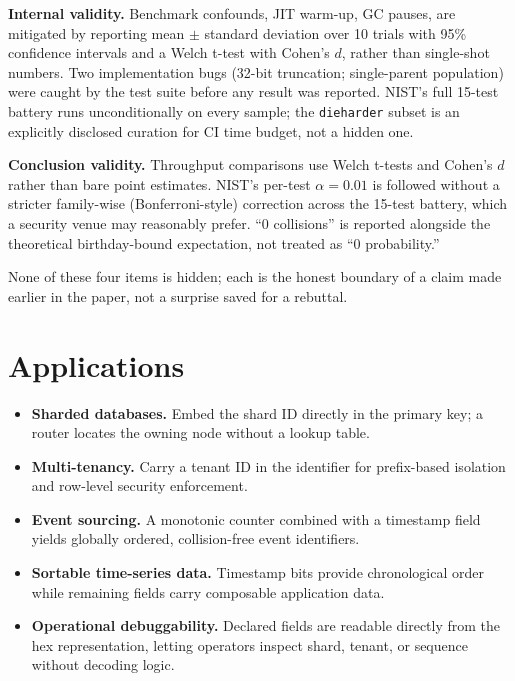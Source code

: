 \documentclass[conference]{IEEEtran}
\begin{document}
\textbf{Internal validity.} Benchmark confounds, JIT warm-up, GC pauses, are mitigated by reporting mean $\pm$ standard deviation over 10 trials with 95\% confidence intervals and a Welch t-test with Cohen's $d$, rather than single-shot numbers. Two implementation bugs (32-bit truncation; single-parent population) were caught by the test suite before any result was reported. NIST's full 15-test battery runs unconditionally on every sample; the \texttt{dieharder} subset is an explicitly disclosed curation for CI time budget, not a hidden one.

\textbf{Conclusion validity.} Throughput comparisons use Welch t-tests and Cohen's $d$ rather than bare point estimates. NIST's per-test $\alpha=0.01$ is followed without a stricter family-wise (Bonferroni-style) correction across the 15-test battery, which a security venue may reasonably prefer. ``0 collisions'' is reported alongside the theoretical birthday-bound expectation, not treated as ``0 probability.''

None of these four items is hidden; each is the honest boundary of a claim made earlier in the paper, not a surprise saved for a rebuttal.

\section{Applications}
\begin{itemize}
    \item \textbf{Sharded databases.} Embed the shard ID directly in the primary key; a router locates the owning node without a lookup table.

    \item \textbf{Multi-tenancy.} Carry a tenant ID in the identifier for prefix-based isolation and row-level security enforcement.

    \item \textbf{Event sourcing.} A monotonic counter combined with a timestamp field yields globally ordered, collision-free event identifiers.

    \item \textbf{Sortable time-series data.} Timestamp bits provide chronological order while remaining fields carry composable application data.

    \item \textbf{Operational debuggability.} Declared fields are readable directly from the hex representation, letting operators inspect shard, tenant, or sequence without decoding logic.
\end{itemize}
\end{document}
